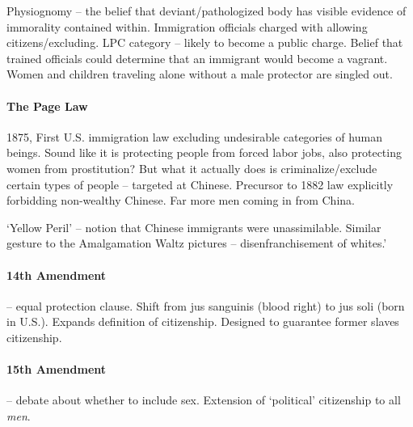 Physiognomy -- the belief that deviant/pathologized body has visible evidence of immorality contained within. Immigration officials charged with allowing citizens/excluding. LPC category -- likely to become a public charge. Belief that trained officials could determine that an immigrant would become a vagrant. Women and children traveling alone without a male protector are singled out.

\paragraph{The Page Law} 1875, First U.S. immigration law excluding undesirable categories of human beings. Sound like it is protecting people from forced labor jobs, also protecting women from prostitution? But what it actually does is criminalize/exclude certain types of people -- targeted at Chinese. Precursor to 1882 law explicitly forbidding non-wealthy Chinese. Far more men coming in from China.

`Yellow Peril' -- notion that Chinese immigrants were unassimilable. Similar gesture to the Amalgamation Waltz pictures -- disenfranchisement of whites.'

\paragraph{14th Amendment} -- equal protection clause. Shift from jus sanguinis (blood right) to jus soli (born in U.S.). Expands definition of citizenship. Designed to guarantee former slaves citizenship.

\paragraph{15th Amendment} -- debate about whether to include sex. Extension of `political' citizenship to all \textit{men}.